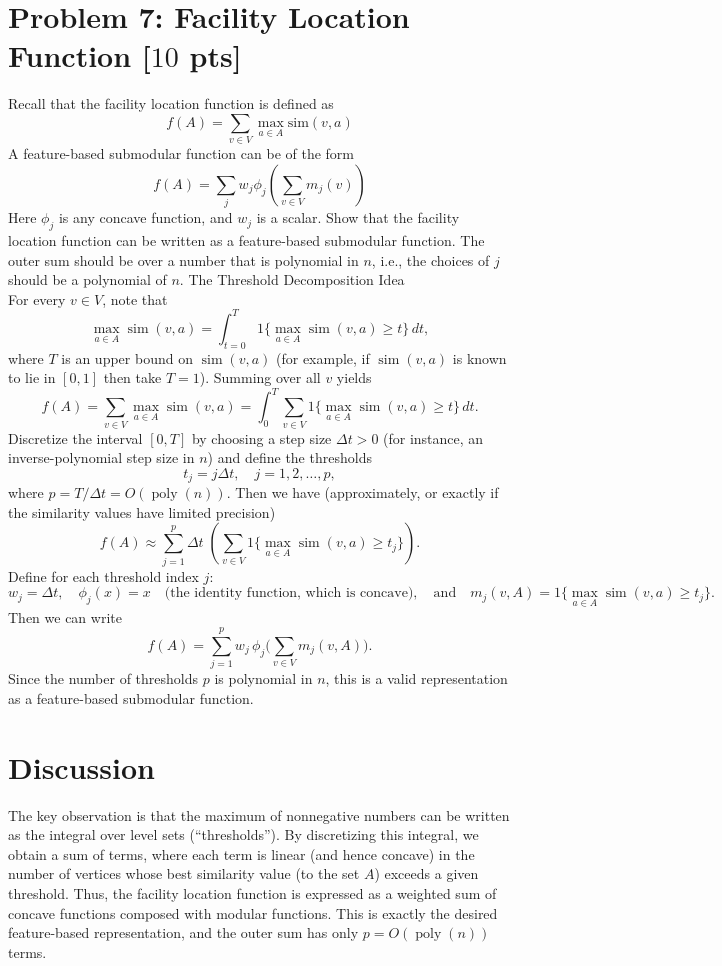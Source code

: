 \documentclass[letterpaper, 11pt]{article}
\newcommand{\1}{\mathds{1}}	%
\theoremstyle{definition}
\newcommand{\problem}[1]{\section*{Problem #1}}
\newenvironment{solution}{{\par\noindent\it Solution.}}{}
\begin{document}
\problem{7: Facility Location Function [$10$ pts]}
Recall that the facility location function is defined as
$$f(A) = \sum_{v \in V} \max_{a \in A} \text{sim}(v,a)$$
A feature-based submodular function can be of the form
$$f(A) = \sum_j w_j\phi_j(\sum_{v \in V} m_j(v))$$
Here $\phi_j$ is any concave function, and $w_j$ is a scalar. Show that the facility location function can be written as a feature-based submodular function. The outer sum should be over a number that is polynomial in $n$, i.e., the choices of $j$ should be a polynomial of $n$.
\begin{solution}
The Threshold Decomposition Idea\\

For every \(v\in V\), note that
\[
\max_{a\in A}\operatorname{sim}(v,a)=\int_{t=0}^{T} 1\Big\{\max_{a\in A}\operatorname{sim}(v,a) \ge t\Big\}\,dt,
\]
where \(T\) is an upper bound on \(\operatorname{sim}(v,a)\) (for example, if \(\operatorname{sim}(v,a)\) is known to lie in \([0,1]\) then take \(T=1\)). Summing over all \(v\) yields
\[
f(A)=\sum_{v\in V}\max_{a\in A}\operatorname{sim}(v,a)=\int_0^T \sum_{v\in V}1\Big\{\max_{a\in A}\operatorname{sim}(v,a)\ge t\Big\}\,dt.
\]
Discretize the interval \([0,T]\) by choosing a step size \(\Delta t>0\) (for instance, an inverse-polynomial step size in \(n\)) and define the thresholds
\[
t_j=j\Delta t,\quad j=1,2,\ldots, p,
\]
where \(p=T/\Delta t=O(\operatorname{poly}(n))\). Then we have (approximately, or exactly if the similarity values have limited precision)
\[
f(A)\approx \sum_{j=1}^{p}\Delta t \; \left(\sum_{v\in V} 1\Big\{\max_{a\in A}\operatorname{sim}(v,a)\ge t_j\Big\}\right).
\]
Define for each threshold index \(j\):
\[
w_j = \Delta t,\quad \phi_j(x)=x \quad \text{(the identity function, which is concave)},\quad \text{and} \quad m_j(v,A) = 1\Big\{\max_{a\in A}\operatorname{sim}(v,a)\ge t_j\Big\}.
\]
Then we can write
\[
f(A)=\sum_{j=1}^{p}w_j\,\phi_j\Biggl(\sum_{v\in V} m_j(v,A)\Biggr).
\]
Since the number of thresholds \(p\) is polynomial in \(n\), this is a valid representation as a feature-based submodular function.

\section*{Discussion}

The key observation is that the maximum of nonnegative numbers can be written as the integral over level sets (``thresholds''). By discretizing this integral, we obtain a sum of terms, where each term is linear (and hence concave) in the number of vertices whose best similarity value (to the set \(A\)) exceeds a given threshold. Thus, the facility location function is expressed as a weighted sum of concave functions composed with modular functions. This is exactly the desired feature-based representation, and the outer sum has only \(p = O(\operatorname{poly}(n))\) terms.


\end{solution}
\end{document}
